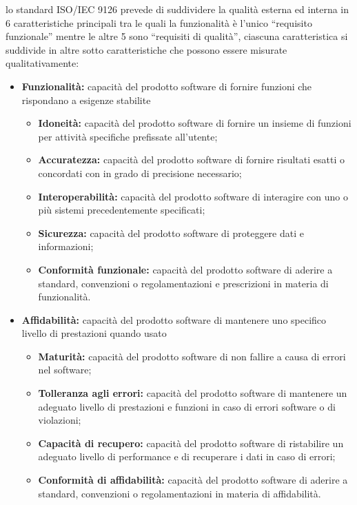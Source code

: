 \documentclass[a4paper]{report}
\begin{document}
				lo standard ISO/IEC 9126 prevede di suddividere la qualità esterna ed interna in 6 caratteristiche principali tra
				le quali la funzionalità è l'unico “requisito funzionale”  mentre le altre 5 sono “requisiti di qualità”, ciascuna
				caratteristica si suddivide in altre sotto caratteristiche che possono essere misurate qualitativamente:
				\begin{itemize}
					\item \textbf{Funzionalità:} capacità del prodotto software di fornire funzioni che rispondano
					a esigenze stabilite
					\begin{itemize}
						\item \textbf{Idoneità:} capacità del prodotto software di fornire un insieme di funzioni per attività
						specifiche prefissate all'utente;
						\item \textbf{Accuratezza:} capacità del prodotto software di fornire risultati esatti o concordati con in
						grado di precisione necessario;
						\item \textbf{Interoperabilità:} capacità del prodotto software di interagire con uno o più sistemi 
						precedentemente specificati;
						\item \textbf{Sicurezza:} capacità del prodotto software di proteggere dati e informazioni;
						\item \textbf{Conformità funzionale:} capacità del prodotto software di aderire a standard, convenzioni
						o regolamentazioni e prescrizioni in materia di funzionalità.
					\end{itemize}
					
					\item \textbf{Affidabilità:} capacità del prodotto software di mantenere uno specifico livello di prestazioni
					quando usato
					\begin{itemize}
						\item \textbf{Maturità:} capacità del prodotto software di non fallire a causa di errori nel software;
						\item \textbf{Tolleranza agli errori:} capacità del prodotto software di mantenere un adeguato livello di
						prestazioni e funzioni in caso di errori software o di violazioni;
						\item \textbf{Capacità di recupero:} capacità del prodotto software di ristabilire un adeguato livello di
						performance e di recuperare i dati in caso di errori;
						\item \textbf{Conformità di affidabilità:} capacità del prodotto software di aderire a standard,
						convenzioni o regolamentazioni in materia di affidabilità.
					\end{itemize}										
					

\end{itemize}
\end{document}
